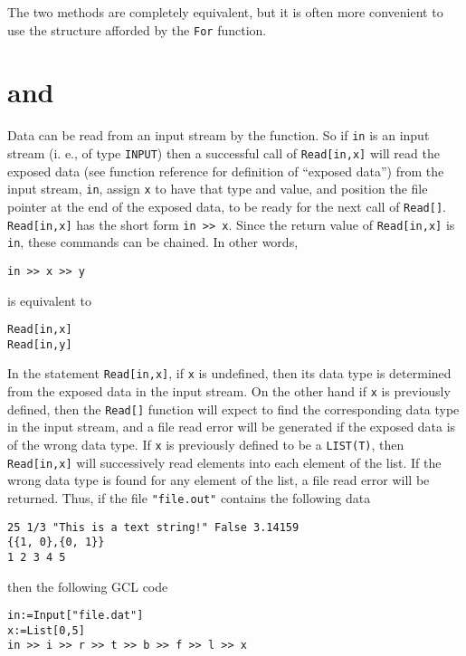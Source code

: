 \noindent The two methods are completely equivalent, but it is often
more convenient to use the structure afforded by the \verb+For+
function.

\section{ and }

Data can be read from an input stream by the  function.
So if \verb+in+ is an input stream (i. e., of type \verb+INPUT+) then
a successful call of \verb+Read[in,x]+ will read the exposed data (see
function reference for definition of ``exposed data'') from the input
stream, \verb+in+, assign \verb+x+ to have that type and value, and
position the file pointer at the end of the exposed data, to be ready
for the next call of \verb+Read[]+.  \verb+Read[in,x]+ has the short
form \verb+in >> x+.  Since the return value of \verb+Read[in,x]+ is
\verb+in+, these commands can be chained.  In other words,

\begin{verbatim}
in >> x >> y
\end{verbatim}
 
\noindent
is equivalent to 

\begin{verbatim}
Read[in,x]
Read[in,y]
\end{verbatim}

\noindent
In the statement \verb+Read[in,x]+, if \verb+x+ is undefined, then its
data type is determined from the exposed data in the input stream.  On
the other hand if \verb+x+ is previously defined, then the
\verb+Read[]+ function will expect to find the corresponding data type
in the input stream, and a file read error will be generated if the
exposed data is of the wrong data type.  If \verb+x+ is previously
defined to be a \verb+LIST(T)+, then \verb+Read[in,x]+ will
successively read elements into each element of the list.  If the
wrong data type is found for any element of the list, a file read
error will be returned.  Thus, if the file \verb+"file.out"+ contains
the following data

\begin{verbatim}
25 1/3 "This is a text string!" False 3.14159 
{{1, 0},{0, 1}}
1 2 3 4 5
\end{verbatim}

\noindent
then the following GCL code

\begin{verbatim}
in:=Input["file.dat"]
x:=List[0,5]
in >> i >> r >> t >> b >> f >> l >> x
\end{verbatim}

